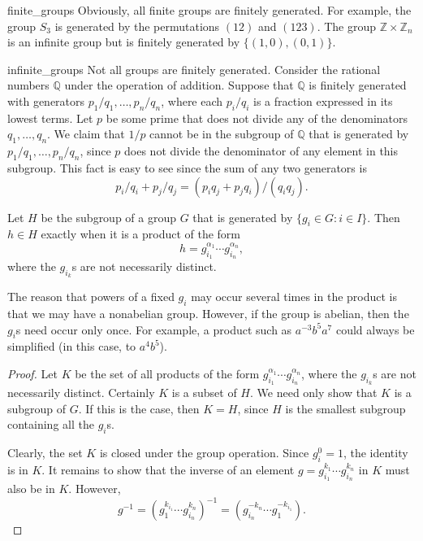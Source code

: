  
\begin{example}{finite_groups}
Obviously, all finite groups are finitely generated. For example, the
group $S_3$ is generated by the permutations $(12)$ and $(123)$. The
group ${\mathbb Z} \times {\mathbb Z}_n$ is an infinite group but is
finitely generated by $\{ (1,0), (0,1) \}$.
\end{example}
 
 
 
\begin{example}{infinite_groups}
Not all groups are finitely generated.  Consider the rational numbers
${\mathbb Q}$ under the operation of addition. Suppose that ${\mathbb Q}$ is
finitely generated with generators $p_1/q_1, \ldots, p_n/q_n$, where
each $p_i/q_i$ is a fraction expressed in its lowest terms.  Let $p$
be some prime that does not divide any of the denominators $q_1,
\ldots, q_n$. We claim that $1/p$ cannot be in the subgroup of ${\mathbb
Q}$ that is generated by  $p_1/q_1, \ldots, p_n/q_n$, since $p$ does
not divide the denominator of any element in this subgroup. This fact
is easy to see since the sum of any two generators is
\[
p_i / q_i + p_j / q_j = (p_i q_j + p_j q_i)/(q_i q_j).
\]
\end{example}
 
 
\begin{theorem}
Let $H$ be the subgroup of a group $G$ that is generated by $\{ g_i
\in G : i \in I \}$. Then $h \in H$ exactly when it is a product of
the form 
\[
h = g_{i_1}^{\alpha_1} \cdots g_{i_n}^{\alpha_n},
\]
where the $g_{i_k}$s are not necessarily distinct.
\end{theorem}
 
 
The reason that powers of a fixed $g_i$ may occur several times in the
product is that we may have a nonabelian group. However, if the group
is abelian, then the $g_i$s need occur only once. For example, a
product such as $a^{-3} b^5 a^7$ could always be simplified (in this
case, to $a^4 b^5$). 
 
 
\medskip
 
 
\begin{proof}
Let $K$ be the set of all products of the form $g_{i_1}^{\alpha_1}
\cdots g_{i_n}^{\alpha_n}$, where the $g_{i_k}$s are not necessarily
distinct. Certainly $K$ is a subset of $H$.  We need only show that
$K$ is a subgroup of $G$. If this is the case, then $K=H$, since $H$ is
the smallest subgroup containing all the $g_i$s.
 
 
Clearly, the set $K$ is closed under the group operation. Since $g_i^0
=1$, the identity is in $K$. It remains to show that the inverse of an
element  $g =g_{i_1}^{k_1} \cdots g_{i_n}^{k_n}$ in $K$ must also be in
$K$. However, 
\[
g^{-1}
= (g_1^{k_{i_1}} \cdots g_{i_n}^{k_n})^{-1}
= (g_{i_n}^{-k_n} \cdots g_{1}^{-k_{i_1}}).
\]
\end{proof}

